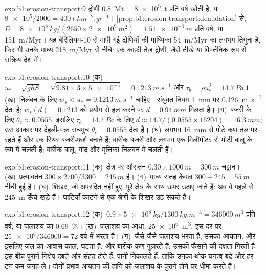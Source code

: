 \begin{solution}{exo:b1:erosion-transport:9}
द्रोणी \qty{0.8}{Mt} = \qty{8e5}{t} प्रति वर्ष खोती है, या $\num{8e5}/2000 =
\qty{400}{t.km^{-2}.yr^{-1}}$। \cref{prop:b1:erosion-transport:denudation} से,
$D = \qty{8e8}{kg}/(2650 \times \qty{2e9}{m^2}) = \qty{1.51e-4}{m}$ प्रति वर्ष, या
\qty{151}{m/Myr}। यह बेरिलियम-10 से मापी गई द्रोणियों की माध्यिका \qty{54}{m/Myr} का लगभग तिगुना है, फिर भी उनके माध्य \qty{218}{m/Myr} से नीचे: एक काफ़ी तेज़ द्रोणी, जैसे तीखे या विवर्तनिक रूप से सक्रिय देश में।
\end{solution}

\begin{solution}{exo:b1:erosion-transport:10}
(क)~$u_* = \sqrt{g h S} = \sqrt{9.81 \times 3 \times \num{5e-4}} =
\qty{0.1213}{m.s^{-1}}$ और $\tau_b = \rho u_*^2 = \qty{14.7}{Pa}$।
(ख)~निलंबन के लिए $w_s < u_* = \qty{0.1213}{m.s^{-1}}$ चाहिए। संयुक्त नियम \qty{1}{mm} पर \qty{0.126}{m.s^{-1}} देता है; $w_s(d) = 0.1213$ को प्रयोग से हल करने पर $d = \qty{0.94}{mm}$ मिलता है। (ग)~बजरी के लिए $\theta_c \approx 0.0555$, इसलिए $\tau_c = \qty{14.7}{Pa}$ के लिए $d \approx
14.7/(0.0555 \times 16204) = \qty{16.3}{mm}$; उस आकार पर देहली-वक्र सचमुच $\theta_c = 0.0555$ देता है। (घ)~लगभग \qty{16}{mm} से मोटे कण तल पर रहते हैं और एक स्थिर बजरी-फ़र्श बनाते हैं; बारीक बजरी और लगभग एक मिलीमीटर से मोटी बालू  के रूप में चलती हैं; बारीक बालू, गाद और मृत्तिका निलंबन में चलती हैं।
\end{solution}

\begin{solution}{exo:b1:erosion-transport:11}
(क)~क्षेत्र पर औसतन $0.30 \times \qty{1000}{m} = \qty{300}{m}$ चट्टान। (ख)~प्रत्यावर्तन $300 \times 2700/3300 = \qty{245}{m}$ है। (ग)~माध्य सतह केवल $300 - 245 = \qty{55}{m}$ नीची हुई है। (घ)~शिखर, जो अपरदित नहीं हुए, पूरे क्षेत्र के साथ ऊपर उठाए जाते हैं: अब वे पहले से \qty{245}{m} ऊँचे खड़े हैं। घाटियाँ काटने से एक श्रेणी के शिखर उठ सकते हैं।
\end{solution}

\begin{solution}{exo:b1:erosion-transport:12}
(क)~$0.9 \times \qty{5e8}{kg}/\qty{1300}{kg.m^{-3}} = \qty{346000}{m^3}$ प्रति वर्ष,
या जलाशय का \qty{0.69}{\percent}। (ख)~जलाशय का आधा, \qty{25e6}{m^3}, इस दर पर $\num{25e6}/\num{346000} = \num{72}\text{ वर्ष}$ में भरता है। (ग)~जैसे-जैसे जलाशय भरता है, उसका आयतन, और इसलिए जल का आवास-काल, घटता है, और बारीक कण गुज़रते हैं: उसकी फँसाने की दक्षता गिरती है। इस बीच पुराने निक्षेप दबते और संहत होते हैं, पानी निकालते हैं, ताकि उनका थोक घनत्व बढ़े और हर टन कम जगह ले। दोनों प्रभाव आयतन की हानि को जलाशय के पुराने होने पर धीमा करते हैं।
\end{solution}

